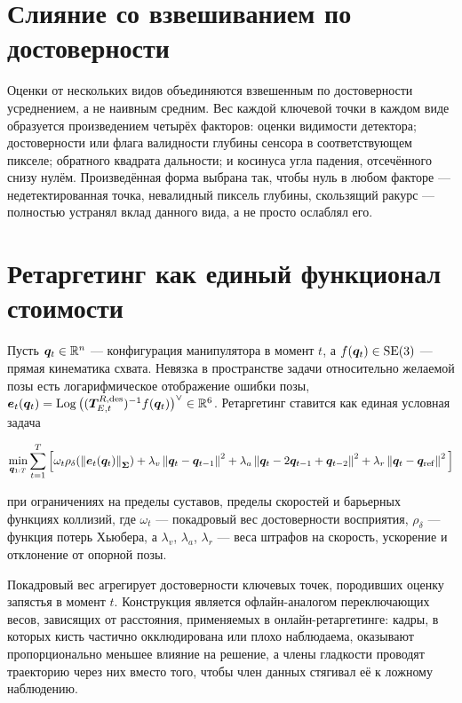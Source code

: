 \documentclass[12pt, a4paper, oneside]{report}
\begin{document}
\section{Слияние со взвешиванием по достоверности}

Оценки от нескольких видов объединяются взвешенным по достоверности усреднением,
а не наивным средним. Вес каждой ключевой точки в каждом виде образуется
произведением четырёх факторов: оценки видимости детектора; достоверности или
флага валидности глубины сенсора в соответствующем пикселе; обратного квадрата
дальности; и косинуса угла падения, отсечённого снизу нулём. Произведённая форма
выбрана так, чтобы нуль в любом факторе --- недетектированная точка, невалидный
пиксель глубины, скользящий ракурс --- полностью устранял вклад данного вида, а
не просто ослаблял его.

\section{Ретаргетинг как единый функционал стоимости}

Пусть $\bm{q}_t \in \mathbb{R}^{n}$ --- конфигурация манипулятора в момент $t$, а
$f(\bm{q}_t) \in \mathrm{SE}(3)$ --- прямая кинематика схвата. Невязка в пространстве задачи
относительно желаемой позы есть логарифмическое отображение ошибки позы,
$\bm{e}_t(\bm{q}_t) = \operatorname{Log}\big((\bm{T}^{R,\mathrm{des}}_{E,t})^{-1} f(\bm{q}_t)\big)^{\vee}
\in \mathbb{R}^{6}$. Ретаргетинг ставится как единая условная задача

\begin{equation}
  \min_{\bm{q}_{1:T}} \sum_{t=1}^{T} \Big[
    \omega_t \rho_\delta\!\left(\left\lVert \bm{e}_t(\bm{q}_t) \right\rVert_{\bm{\Sigma}}\right)
    + \lambda_v \left\lVert \bm{q}_t - \bm{q}_{t-1} \right\rVert^{2}
    + \lambda_a \left\lVert \bm{q}_t - 2\bm{q}_{t-1} + \bm{q}_{t-2} \right\rVert^{2}
    + \lambda_r \left\lVert \bm{q}_t - \bm{q}_{\mathrm{ref}} \right\rVert^{2}
  \Big]
\end{equation}

при ограничениях на пределы суставов, пределы скоростей и барьерных функциях
коллизий, где $\omega_t$ --- покадровый вес достоверности восприятия,
$\rho_\delta$ --- функция потерь Хьюбера, а $\lambda_v$, $\lambda_a$,
$\lambda_r$ --- веса штрафов на скорость, ускорение и отклонение от опорной
позы.

Покадровый вес агрегирует достоверности ключевых точек, породивших оценку
запястья в момент $t$. Конструкция является офлайн-аналогом переключающих весов,
зависящих от расстояния, применяемых в онлайн-ретаргетинге: кадры, в которых
кисть частично окклюдирована или плохо наблюдаема, оказывают пропорционально
меньшее влияние на решение, а члены гладкости проводят траекторию через них
вместо того, чтобы член данных стягивал её к ложному наблюдению.
\end{document}
